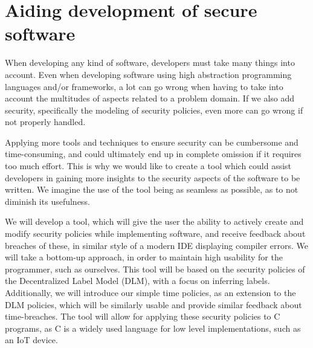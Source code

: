 
\section{Aiding development of secure software}
When developing any kind of software, developers must take many things into account.
Even when developing software using high abstraction programming languages and/or frameworks, a lot can go wrong when having to take into account the multitudes of aspects related to a problem domain.
If we also add security, specifically the modeling of security policies, even more can go wrong if not properly handled.

Applying more tools and techniques to ensure security can be cumbersome and time-consuming, and could ultimately end up in complete omission if it requires too much effort.
This is why we would like to create a tool which could assist developers in gaining more insights to the security aspects of the software to be written.
We imagine the use of the tool being as seamless as possible, as to not diminish its usefulness.

We will develop a tool, which will give the user the ability to actively create and modify security policies while implementing software, and receive feedback about breaches of these, in similar style of a modern IDE displaying compiler errors.
We will take a bottom-up approach, in order to maintain high usability for the programmer, such as ourselves.
This tool will be based on the security policies of the Decentralized Label Model (DLM), with a focus on inferring labels.
Additionally, we will introduce our simple time policies, as an extension to the DLM policies, which will be similarly usable and provide similar feedback about time-breaches.
The tool will allow for applying these security policies to C programs, as C is a widely used language for low level implementations, such as an IoT device.
